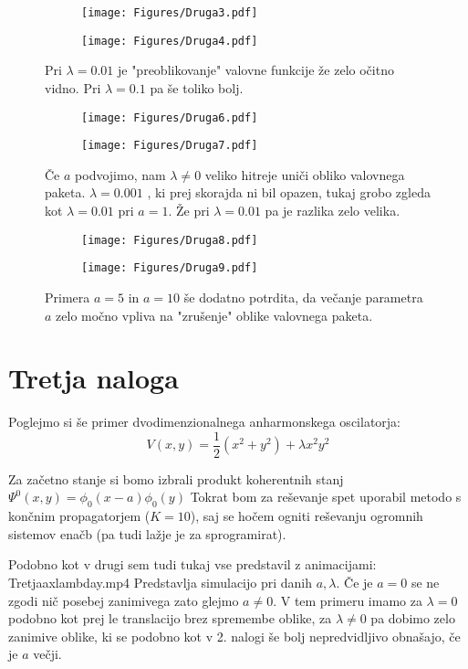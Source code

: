 \documentclass{article}
\begin{document}
\begin{figure}[H]
\centering
\begin{subfigure}{.49\textwidth}
\texttt{[image: Figures/Druga3.pdf]}
\end{subfigure}
\begin{subfigure}{.49\textwidth}
\texttt{[image: Figures/Druga4.pdf]}
\end{subfigure}
\caption*{Pri $\lambda=0.01$ je "preoblikovanje" valovne funkcije že zelo očitno vidno. Pri $\lambda=0.1$ pa še toliko bolj.}
\end{figure}

\begin{figure}[H]
\centering
\begin{subfigure}{.49\textwidth}
\texttt{[image: Figures/Druga6.pdf]}
\end{subfigure}
\begin{subfigure}{.49\textwidth}
\texttt{[image: Figures/Druga7.pdf]}
\end{subfigure}
\caption*{Če $a$ podvojimo, nam $\lambda \neq 0$ veliko hitreje uniči obliko valovnega paketa. $\lambda = 0.001$ , ki prej skorajda ni bil opazen, tukaj grobo zgleda kot $\lambda = 0.01$ pri $a=1$. Že pri $\lambda=0.01$ pa je razlika zelo velika.}
\end{figure}

\begin{figure}[H]
\centering
\begin{subfigure}{.49\textwidth}
\texttt{[image: Figures/Druga8.pdf]}
\end{subfigure}
\begin{subfigure}{.49\textwidth}
\texttt{[image: Figures/Druga9.pdf]}
\end{subfigure}
\caption*{Primera $a=5$ in $a=10$ še dodatno potrdita, da večanje parametra $a$ zelo močno vpliva na "zrušenje" oblike valovnega paketa.}
\end{figure}

\section{Tretja naloga}

Poglejmo si še primer dvodimenzionalnega anharmonskega oscilatorja:
\begin{equation*}
V(x,y) = \frac{1}{2}(x^2+y^2) + \lambda x^2 y^2
\end{equation*}

Za začetno stanje si bomo izbrali produkt koherentnih stanj $\Psi^0(x,y) = \phi_0(x-a) \phi_0(y)$
Tokrat bom za reševanje spet uporabil metodo s končnim propagatorjem ($K=10$), saj se hočem ogniti reševanju ogromnih sistemov enačb (pa tudi lažje je za sprogramirat).

Podobno kot v drugi sem tudi tukaj vse predstavil z animacijami:
Tretjaaxlambday.mp4 Predstavlja simulacijo pri danih $a, \lambda$. Če je $a=0$ se ne zgodi nič posebej zanimivega zato glejmo $a \neq 0$. V tem primeru imamo za $\lambda =0$ podobno kot prej le translacijo brez spremembe oblike, za $\lambda \neq 0$ pa dobimo zelo zanimive oblike, ki se podobno kot v 2. nalogi še bolj nepredvidljivo obnašajo, če je $a$ večji.
\end{document}

